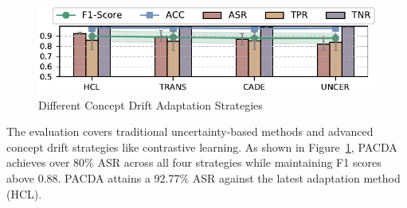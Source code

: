 \documentclass[conference,compsoc]{IEEEtran} %
\begin{document}
\begin{figure}[h!]
	\centering
	\includegraphics[width=\linewidth,keepaspectratio]{Graph/Evaluation/Figure13.pdf}
	\caption{Different Concept Drift Adaptation Strategies}
	\label{fig:Attack-effectiveness-Concept-Drift-Strategy}
\end{figure}
The evaluation covers traditional uncertainty-based methods and advanced concept drift strategies like contrastive learning.
As shown in Figure~\ref{fig:Attack-effectiveness-Concept-Drift-Strategy}, PACDA achieves over 80\% ASR across all four strategies while maintaining F1 scores above 0.88.
PACDA attains a 92.77\% ASR against the latest adaptation method (HCL).

\end{document}
